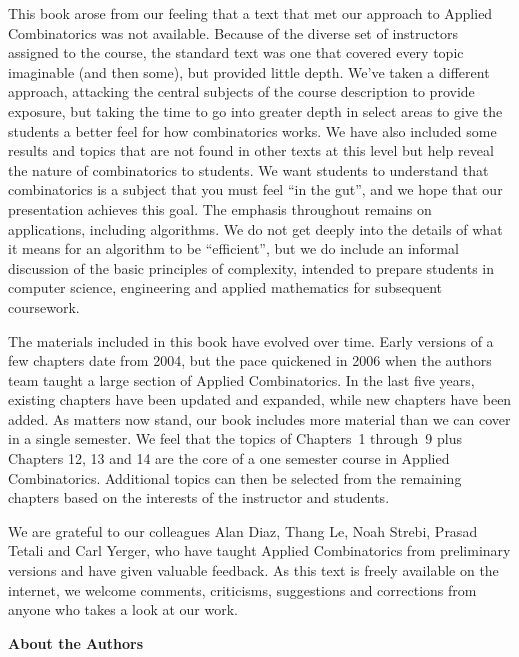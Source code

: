 This book arose from our feeling that a text that met our approach to
Applied Combinatorics was not available. Because of the diverse set of
instructors assigned to the course, the standard text was one that
covered every topic imaginable (and then some), but provided little
depth. We've taken a different approach, attacking the central
subjects of the course description to provide exposure, but taking the
time to go into greater depth in select areas to give the students a
better feel for how combinatorics works. We have also included some
results and topics that are not found in other texts at this level but
help reveal the nature of combinatorics to students. We want 
students to understand that combinatorics is a subject
that you must feel ``in the gut'', and we hope that our presentation
achieves this goal. The emphasis throughout remains on applications,
including algorithms. We do not get deeply into the details of what it
means for an algorithm to be ``efficient'', but we do include an informal
discussion of the basic principles of complexity, intended 
to prepare students in computer science, engineering and applied mathematics
for subsequent coursework.

The materials included in this book have evolved over time.  Early
versions of a few chapters date from 2004, but the pace quickened in
2006 when the authors team taught a large section of Applied 
Combinatorics.  In the last five years, existing chapters have been
updated and expanded, while new chapters
have been added.  As matters now stand, our book includes more material
than we can cover in a single semester. We feel that the topics of
Chapters~1 through~9 plus Chapters 12, 13 and 14 are the core of
a one semester course in Applied Combinatorics. 
Additional topics can then be selected from the remaining chapters 
based on the interests of the instructor and students. 

We are grateful to our colleagues Alan Diaz, Thang Le, Noah Strebi, Prasad Tetali
and Carl Yerger, who have taught Applied Combinatorics from preliminary 
versions and have given valuable feedback.  As this text is freely
available on the internet, we welcome comments, criticisms, suggestions
and corrections from anyone who takes a look at our work. 

\vspace{.5in}
\noindent
\textbf{About the Authors}


